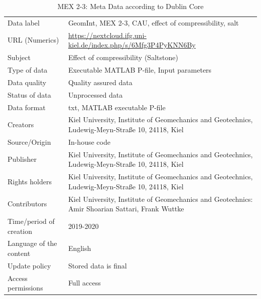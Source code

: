 \begin{table}[!ht]
\caption{MEX 2-3: Meta Data according to Dublin Core}
\label{tab:dms-mex23}
\small
\begin{tabular}{R{3.5cm}|L{7.5cm}}
\hline
%
Data label & GeomInt, MEX 2-3, CAU, effect of compressibility, salt\\
URL (Numerics) & \url{https://nextcloud.ifg.uni-kiel.de/index.php/s/6Mfg3P4PyKNN6By} \\
Subject  &  Effect of compressibility (Saltstone)\\
Type of data  & Executable MATLAB P-file, Input parameters\\
Data quality  &  Quality assured data \\
Status of data  &  Unprocessed data\\
Data format  & txt, MATLAB executable P-file\\
Creators  &  Kiel University, Institute of Geomechanics and Geotechnics, Ludewig-Meyn-Stra\ss e 10, 24118, Kiel\\
Source/Origin & In-house code \\
Publisher  &  Kiel University, Institute of Geomechanics and Geotechnics, Ludewig-Meyn-Stra\ss e 10, 24118, Kiel \\
Rights holders &  Kiel University, Institute of Geomechanics and Geotechnics, Ludewig-Meyn-Stra\ss e 10, 24118, Kiel \\
Contributors &   Kiel University, Institute of Geomechanics and Geotechnics: Amir Shoarian Sattari, Frank Wuttke \\
Time/period of creation &  2019-2020\\
Language of the content &  English\\
Update policy &  Stored data is final\\
Access permissions & Full access\\
%
\hline
\end{tabular}
\end{table}


